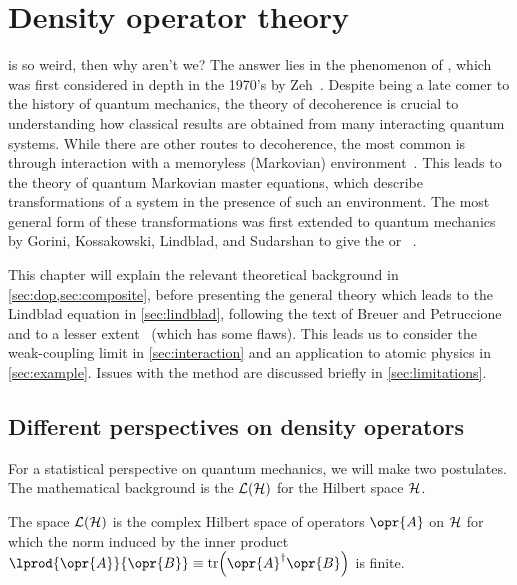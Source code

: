 \documentclass[../thesis.tex]{subfiles}
\begin{document}
\chapter{Density operator theory}

 is so weird, then why aren't we? The answer
lies in the phenomenon of , which was first considered in
depth in the 1970's by Zeh~\cite{zeh}. Despite being a late comer to the history
of quantum mechanics, the theory of decoherence is crucial to understanding how
classical results are obtained from many interacting quantum systems. While
there are other routes to decoherence, the most common is through interaction
with a memoryless (Markovian) environment~\cite{decoherence}. This leads to the
theory of quantum Markovian master equations, which describe transformations of
a system in the presence of such an environment. The most general form of these
transformations was first extended to quantum mechanics by Gorini, Kossakowski,
Lindblad, and Sudarshan to give the \textsc{} or ~\cite{gks,lindblad}.

This chapter will explain the relevant theoretical background in
\cref{sec:dop,sec:composite}, before presenting the general theory which leads
to the Lindblad equation in \cref{sec:lindblad}, following the text of Breuer
and Petruccione~\cite{opensys} and to a lesser extent~\cite{intro} (which has
some flaws). This leads us to consider the weak-coupling limit in
\cref{sec:interaction} and an application to atomic physics in
\cref{sec:example}. Issues with the method are discussed briefly in
\cref{sec:limitations}.

\section{Different perspectives on density operators\label{sec:dop}}

For a statistical perspective on quantum mechanics, we will make two postulates.
The mathematical background is the  $\mathcal{L}(\mathcal{H})$ for the
Hilbert space $\mathcal{H}$.
\begin{defn}
  The space $\mathcal{L}(\mathcal{H})$ is the complex Hilbert space of operators $\opr{A}$
  on $\mathcal{H}$ for which the norm induced by the inner product
  $\lprod{\opr{A}}{\opr{B}} \defeq \tr(\opr{A}^\dag \opr{B})$ is finite.
\end{defn}
\end{document}
